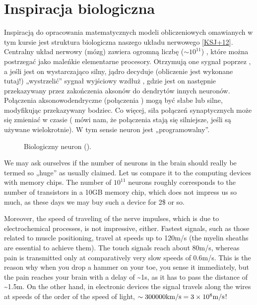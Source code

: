 \documentclass[a4paper,12pt,polish]{jupyterBook}
\let\sphinxpxdimen\pdfpxdimen\else\newdimen\sphinxpxdimen
\begin{document}
\section{Inspiracja biologiczna}
\label{\detokenize{docs/intro:inspiracja-biologiczna}}
\sphinxAtStartPar
Inspiracją do opracowania matematycznych modeli obliczeniowych omawianych w tym kursie jest struktura biologiczna naszego układu nerwowego {[}\hyperlink{cite.docs/conclusion:id6}{KSJ+12}{]}. Centralny układ nerwowy (mózg) zawiera ogromną liczbę (\(\sim 10^{11}\)) , które można postrzegać jako maleńkie  elementarne procesory. Otrzymują one sygnał poprzez , a jeśli jest on wystarczająco silny, jądro decyduje (obliczenie jest wykonane tutaj!) „wystrzelić” sygnał wyjściowy wzdłuż , gdzie jest on następnie przekazywany przez zakończenia aksonów do dendrytów innych neuronów. Połączenia aksonowo\sphinxhyphen{}dendryczne (połączenia ) mogą być słabe lub silne, modyfikując przekazywany bodziec. Co więcej, siła połączeń synaptycznych może się zmieniać w czasie ( mówi nam, że połączenia stają się silniejsze, jeśli są używane wielokrotnie). W tym sensie neuron jest „programowalny”.

\begin{figure}[htbp]
\centering
\capstart

\noindent\sphinxincludegraphics[width=450\sphinxpxdimen]{{neuron-structure}.jpg}
\caption{Biologiczny neuron ().}\label{\detokenize{docs/intro:neuron-fig}}\end{figure}

\sphinxAtStartPar
We may ask ourselves if the number of neurons in the brain should really be termed so „huge” as usually claimed. Let us compare it to the computing devices with memory chips. The number of \(10^{11}\) neurons roughly corresponds to the number of transistors in a 10GB memory chip, which does not impress us so much, as these days we may buy such a device for 2\$ or so.

\sphinxAtStartPar
Moreover, the speed of traveling of the nerve impulses, which is due to electrochemical processes, is not impressive, either. Fastest signals, such as those related to muscle positioning, travel at speeds up to 120m/s (the myelin sheaths are essential to achieve them). The touch signals reach about 80m/s, whereas pain is transmitted only at comparatively very slow speeds of 0.6m/s. This is the reason why when you drop a hammer on your toe, you sense it immediately, but the pain reaches your brain with a delay of \textasciitilde{}1s, as it has to pass the distance of \textasciitilde{}1.5m. On the other hand, in electronic devices the signal travels along the wires at speeds of the order of the speed of light, \(\sim 300000{\rm km/s}=3\times 10^{8}{\rm m/s}\)!
\end{document}
